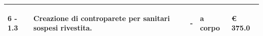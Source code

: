 \documentclass[a4paper]{article}
\begin{document}
\begin{tabular}{ | L{10mm} |  L{86mm} | L{12mm} | L{12mm} | L{16mm} | }
                            
                              \vspace{2.5mm}
                              \begin{spacing}{0}
                           6 - 1.3
                              \end{spacing} &
                              \vspace{2.5mm}
                              \begin{spacing}{0}
                           Creazione di controparete per sanitari sospesi rivestita.
                              \end{spacing} &
                              \vspace{2.5mm}
                              \begin{spacing}{0}
                           -
                              \end{spacing} &
                              \vspace{2.5mm}
                              \begin{spacing}{0}
                           a corpo
                              \end{spacing} &
                              \vspace{2.5mm}
                              \begin{spacing}{0}
                                \euro\hfill 
                            375.0
                              \end{spacing} \\
                              \hline

                            
                          \end{tabular}
\end{document}
